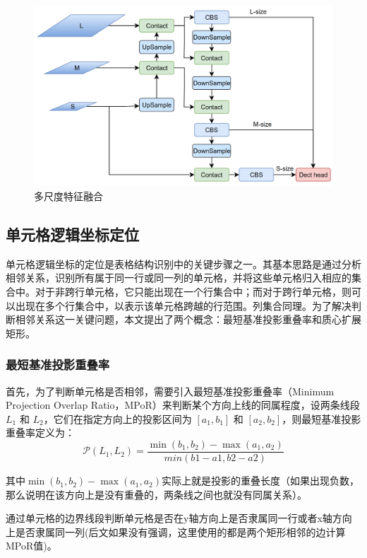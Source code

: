 \documentclass[UTF8,12pt, AutoFakeBold,fontset = founder]{ctexart}
\begin{document}
\begin{figure}[H]
    \centering
    \includegraphics[width=\textwidth]{../images/neck.png}
    \caption{多尺度特征融合}
    \label{fig:neck}
\end{figure}
\subsection{单元格逻辑坐标定位}

单元格逻辑坐标的定位是表格结构识别中的关键步骤之一。其基本思路是通过分析相邻关系，识别所有属于同一行或同一列的单元格，并将这些单元格归入相应的集合中。对于非跨行单元格，它只能出现在一个行集合中；而对于跨行单元格，则可以出现在多个行集合中，以表示该单元格跨越的行范围。列集合同理。为了解决判断相邻关系这一关键问题，本文提出了两个概念：最短基准投影重叠率和质心扩展矩形。

\subsubsection{最短基准投影重叠率}
首先，为了判断单元格是否相邻，需要引入最短基准投影重叠率（Minimum Projection Overlap Ratio，MPoR）来判断某个方向上线的同属程度，设两条线段 \( L_1 \) 和 \( L_2 \)，它们在指定方向上的投影区间为 \([a_1, b_1]\) 和 \([a_2, b_2]\)，则最短基准投影重叠率定义为：
\begin{equation}
    \mathcal{P}(L_1,L_2) = \frac{\min(b_1, b_2) - \max(a_1, a_2)}{min(b1-a1, b2-a2)}
\label{eq:piol}
\end{equation}


其中$\min(b_1, b_2) - \max(a_1, a_2)$实际上就是投影的重叠长度（如果出现负数，那么说明在该方向上是没有重叠的，两条线之间也就没有同属关系）。

通过单元格的边界线段判断单元格是否在y轴方向上是否隶属同一行或者x轴方向上是否隶属同一列(后文如果没有强调，这里使用的都是两个矩形相邻的边计算MPoR值)。
\end{document}
